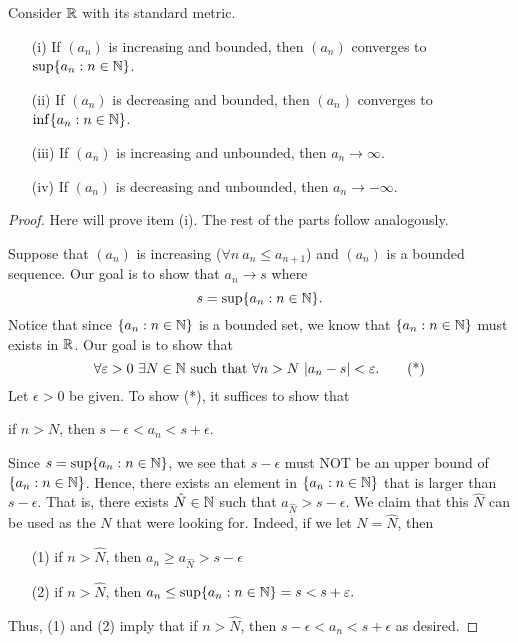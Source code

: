 \documentclass[a4paper]{article}
\begin{document}
\begin{theorem}
    Consider \( \mathbb{R}  \) with its standard metric. 
    \begin{enumerate}
        \item[(i)] If \( ({a}_{n}) \) is increasing and bounded, then \( ({a}_{n}) \) converges to \( \sup \{ {a}_{n} : n \in \mathbb{N} \}  \).
        \item[(ii)] If \( ({a}_{n}) \) is decreasing and bounded, then \( ({a}_{n}) \) converges to \( \inf \{ {a}_{n} : n \in \mathbb{N} \}  \).
        \item[(iii)] If \( ({a}_{n}) \) is increasing and unbounded, then \( {a}_{n} \to \infty  \).
        \item[(iv)] If \( ({a}_{n}) \) is decreasing and unbounded, then \( {a}_{n} \to - \infty  \).
    \end{enumerate}
\end{theorem}
\begin{proof}
Here will prove item (i). The rest of the parts follow analogously.

Suppose that \( ({a}_{n}) \) is increasing (\( \forall n \  {a}_{n} \leq {a}_{n+1} \)) and \( ({a}_{n}) \) is a bounded sequence. Our goal is to show that \( {a}_{n} \to s  \) where
\[  s = \sup \{ {a}_{n} : n \in \mathbb{N} \}.  \]
Notice that since \( \{ {a}_{n} : n \in \mathbb{N} \}  \) is a bounded set, we know that \( \{ {a}_{n} : n \in \mathbb{N} \}  \) must exists in \( \mathbb{R} \). Our goal is to show that  
\[  \forall \epsilon > 0 \ \exists N \in \N \ \text{such that} \ \forall n > N \ | {a}_{n} - s  |  < \epsilon. \tag{*} \]
Let \( \epsilon > 0  \) be given. To show (*), it suffices to show that 
\begin{center}
    if \( n > N  \), then \( s - \epsilon < {a}_{n} < s + \epsilon \).
\end{center}
Since \( s = \sup \{ {a}_{n} : n \in \mathbb{N}  \}  \), we see that \( s - \epsilon  \) must NOT be an upper bound of \( \{ {a}_{n} : n \in \mathbb{N}  \}  \). Hence, there exists an element in \( \{ {a}_{n} : n \in \mathbb{N} \}  \) that is larger than \( s - \epsilon  \). That is, there exists \( \hat{N} \in \mathbb{N} \) such that \( {a}_{\hat{N}} > s - \epsilon  \). We claim that this \( \hat{N} \) can be used as the \( N  \) that were looking for. Indeed, if we let \( N = \hat{N} \), then 
\begin{enumerate}
    \item[(1)] if \( n > \hat{N} \), then \( {a}_{n} \geq {a}_{\hat{N}} > s - \epsilon \)
    \item[(2)] if \( n > \hat{N} \), then \( {a}_{n} \leq \sup \{ {a}_{n} : n \in \mathbb{N}  \}  = s < s + \varepsilon. \)
\end{enumerate}
Thus, (1) and (2) imply that if \( n > \hat{N} \), then \( s - \epsilon < {a}_{n} < s + \epsilon \) as desired.
\end{proof}
\end{document}
